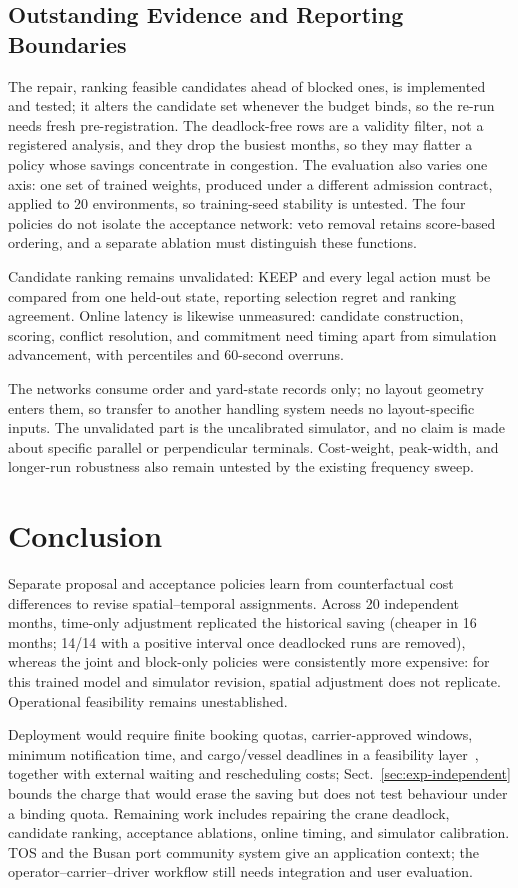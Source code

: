 \documentclass[a4paper]{llncs}
\begin{document}
\subsection{Outstanding Evidence and Reporting Boundaries}
\label{sec:pending-evidence}
The repair, ranking feasible candidates ahead of blocked ones, is
implemented and tested; it alters the candidate set whenever the budget
binds, so the re-run needs fresh pre-registration. The deadlock-free rows are a validity filter, not a registered
analysis, and they drop the busiest months, so they may flatter a policy
whose savings concentrate in congestion. The evaluation also varies one
axis: one set of trained weights, produced under a different admission
contract, applied to 20 environments, so training-seed stability is
untested. The four policies do not isolate the
acceptance network: veto removal retains score-based ordering, and a
separate ablation must distinguish these functions.

Candidate ranking remains unvalidated: KEEP and every legal action must
be compared from one held-out state, reporting selection regret and
ranking agreement. Online latency is likewise unmeasured: candidate construction, scoring, conflict
resolution, and commitment need timing apart from simulation
advancement, with percentiles and 60-second overruns.

The networks consume order and yard-state records only; no layout
geometry enters them, so transfer to another handling system needs no
layout-specific inputs. The unvalidated part is the uncalibrated
simulator, and no claim is made about specific parallel or perpendicular
terminals. Cost-weight,
peak-width, and longer-run robustness also remain untested by the
existing frequency sweep.

\section{Conclusion}
\label{sec:concl}
Separate proposal and acceptance policies learn from counterfactual
cost differences to revise spatial--temporal assignments. Across 20
independent months, time-only adjustment replicated the historical
saving (cheaper in 16 months; 14/14 with a positive interval once
deadlocked runs are removed), whereas the joint and block-only policies
were consistently more expensive: for this trained model and simulator
revision, spatial adjustment does not replicate. Operational feasibility remains
unestablished.

Deployment would require finite booking quotas, carrier-approved
windows, minimum notification time, and cargo/vessel deadlines in a
feasibility layer~\cite{ref4,ref6,refquota}, together with external
waiting and rescheduling costs; Sect.~\ref{sec:exp-independent} bounds
the charge that would erase the saving but does not test behaviour under
a binding quota. Remaining work includes repairing the crane deadlock,
candidate ranking, acceptance ablations, online timing, and simulator
calibration. TOS and the Busan port community system give an application
context; the operator--carrier--driver workflow still needs integration
and user evaluation.
\end{document}
